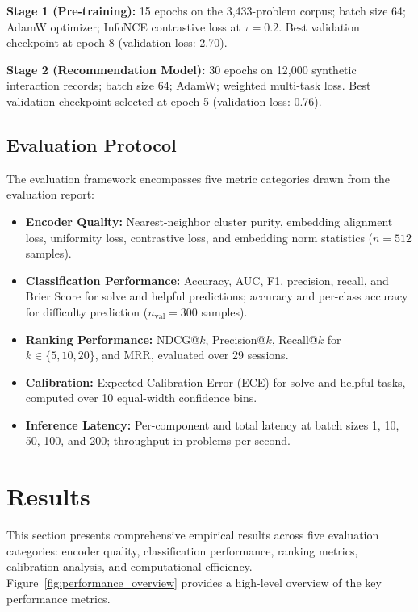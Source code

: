 \documentclass[12pt]{article}
\begin{document}
\textbf{Stage 1 (Pre-training):} 15 epochs on the 3,433-problem corpus; batch size 64; AdamW optimizer; InfoNCE contrastive loss at $\tau = 0.2$. Best validation checkpoint at epoch 8 (validation loss: 2.70).

\textbf{Stage 2 (Recommendation Model):} 30 epochs on 12,000 synthetic interaction records; batch size 64; AdamW; weighted multi-task loss. Best validation checkpoint selected at epoch 5 (validation loss: 0.76).

\subsection{Evaluation Protocol}

The evaluation framework encompasses five metric categories drawn from the evaluation report:

\begin{itemize}
    \item \textbf{Encoder Quality:} Nearest-neighbor cluster purity, embedding alignment loss, uniformity loss, contrastive loss, and embedding norm statistics ($n = 512$ samples).
    \item \textbf{Classification Performance:} Accuracy, AUC, F1, precision, recall, and Brier Score for solve and helpful predictions; accuracy and per-class accuracy for difficulty prediction ($n_{\text{val}} = 300$ samples).
    \item \textbf{Ranking Performance:} NDCG@$k$, Precision@$k$, Recall@$k$ for $k \in \{5, 10, 20\}$, and MRR, evaluated over 29 sessions.
    \item \textbf{Calibration:} Expected Calibration Error (ECE) for solve and helpful tasks, computed over 10 equal-width confidence bins.
    \item \textbf{Inference Latency:} Per-component and total latency at batch sizes 1, 10, 50, 100, and 200; throughput in problems per second.
\end{itemize}

\section{Results}

This section presents comprehensive empirical results across five evaluation categories: encoder quality, classification performance, ranking metrics, calibration analysis, and computational efficiency. Figure~\ref{fig:performance_overview} provides a high-level overview of the key performance metrics.
\end{document}
